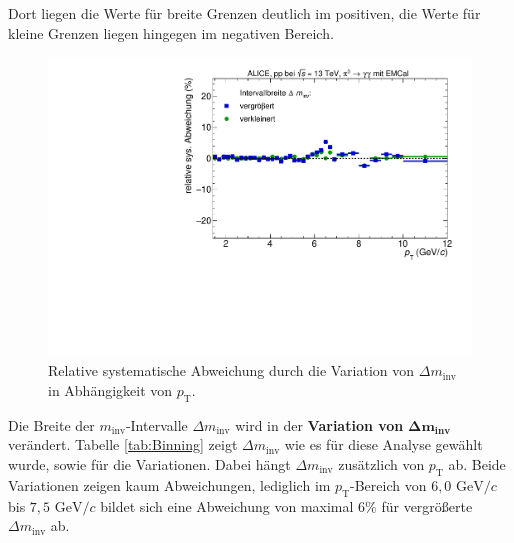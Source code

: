 Dort liegen die Werte für breite Grenzen deutlich im positiven, die Werte für kleine Grenzen liegen hingegen im negativen Bereich.
\begin{figure}[t!]
\centering
\includegraphics[width=.65\linewidth]{YieldsSysUncerRebinning_Data_2016.pdf}
\caption{Relative systematische Abweichung durch die Variation von $\Delta m_\text{inv}$ in Abhängigkeit von $p_\text{T}$.}
\label{fig:BinningSys}
\end{figure}
\newline
Die Breite der $m_\text{inv}$-Intervalle $\Delta m_\text{inv}$ wird in der \textbf{Variation von} $\boldsymbol{\Delta m}_\textbf{inv}$ verändert.
Tabelle \ref{tab:Binning} zeigt $\Delta m_\text{inv}$ wie es für diese Analyse gewählt wurde, sowie für die Variationen.
Dabei hängt $\Delta m_\text{inv}$ zusätzlich von $p_\text{T}$ ab.
\newline
Beide Variationen zeigen kaum Abweichungen, lediglich im $p_\text{T}$-Bereich von $6,0 \text{ GeV}/c$ bis $7,5 \text{ GeV}/c$ bildet sich eine Abweichung von maximal $6\%$ für vergrößerte $\Delta m_\text{inv}$ ab.
